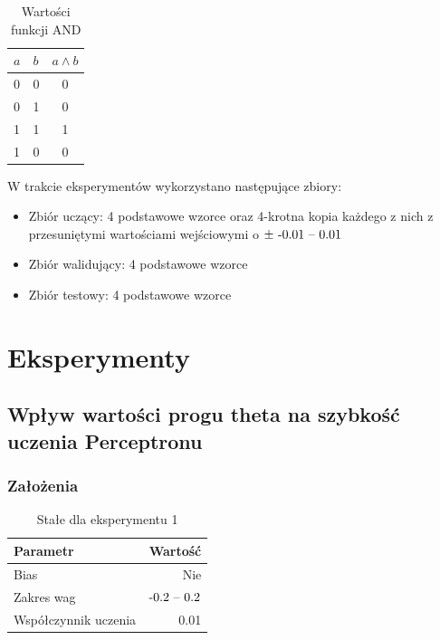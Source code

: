 \documentclass{article}
\begin{document}
\begin{table}[!h]
	\caption{Wartości funkcji AND}
	\label{tabela-and}
	\centering
	\begin{tabular}{llc}
		\toprule
		\(a\) & \(b\) & \(a \land b\) \\
		\midrule
		0     & 0     & 0             \\
		0     & 1     & 0             \\
		1     & 1     & 1             \\
		1     & 0     & 0             \\
		\bottomrule
	\end{tabular}
\end{table}

W trakcie eksperymentów wykorzystano następujące zbiory:
\begin{itemize}
	\item Zbiór uczący: 4 podstawowe wzorce oraz 4-krotna kopia każdego z nich z przesuniętymi wartościami wejściowymi o \(\pm\ $-0.01 -- 0.01$\)
	\item Zbiór walidujący: 4 podstawowe wzorce
	\item Zbiór testowy: 4 podstawowe wzorce
\end{itemize}

\newpage
\section{Eksperymenty}

\subsection{Wpływ wartości progu theta na szybkość uczenia Perceptronu}
\subsubsection*{Założenia}
\begin{table}[!h]
	\caption{Stałe dla eksperymentu 1}
	\label{tabela-const-1}
	\centering
	\begin{tabular}{lr}
		\toprule
		Parametr               & Wartość         \\
		\midrule
		Bias                   & Nie               \\
		Zakres wag             & \($-0.2 -- 0.2$\) \\
		Współczynnik uczenia & 0.01              \\
		\bottomrule
	\end{tabular}
\end{table}
\end{document}
